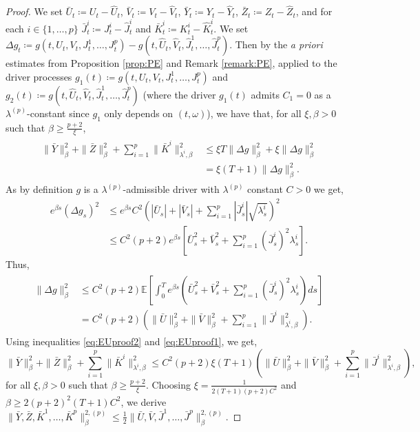 \documentclass[11pt,a4paper]{article}
\numberwithin{equation}{section}
\theoremstyle{newPlain}
\theoremstyle{newDefinition}
\theoremstyle{newRemark}
\begin{document}
{\begin{proof}
    We set $\bar{U}_t\coloneqq U_t-\hat{U}_t$, $\bar{V}_t\coloneqq V_t - \hat{V}_t$, $\bar{Y}_t\coloneqq Y_t - \hat{Y}_t$, $\bar{Z}_t\coloneqq Z_t - \hat{Z}_t$, and for each $i\in\{1,\ldots,p\}$ $\bar{J}_t^i\coloneqq J_t^i - \hat{J}_t^i$ and $\bar{K}_t^i\coloneqq K_t^i - \hat{K}_t^i$. We set $\Delta g_t\coloneqq g(t,U_t,V_t,J_t^1,\ldots,J_t^p) - g(t,\hat{U}_t,\hat{V}_t,\hat{J}_t^1,\ldots,\hat{J}_t^p)$.
    Then by the \emph{a priori} estimates from Proposition \ref{prop:PE} and Remark \ref{remark:PE}, applied to the driver processes $g_1(t)\coloneqq g(t,U_t,V_t,J_t^1,\ldots,J_t^p)$ and $g_2(t)\coloneqq g(t,\hat{U}_t,\hat{V}_t,\hat{J}_t^1,\ldots,\hat{J}_t^p)$ (where the driver $g_1(t)$ admits $C_1=0$ as a $\lambda^{(p)}$-constant since $g_1$ only depends on $(t,\omega)$), we have that,  for all $\xi,\beta>0$ such that $\beta\ge\frac{p+2}{\xi}$,
    \begin{align}\label{eq:EUproof1}
        \begin{aligned}
            \|\bar{Y}\|_\beta^2+\|\bar{Z}\|_\beta^2+\sum_{i=1}^p\|\bar{K}^i\|_{\lambda^i,\beta}^2 &\le \xi T\|\Delta g\|_\beta^2 + \xi \|\Delta g\|_\beta^2\\
            &=\xi(T+1)\|\Delta g\|_\beta^2.
        \end{aligned}
    \end{align}
 As by definition $g$ is a $\lambda^{(p)}$-admissible driver with $\lambda^{(p)}$ constant $C>0$ we get,
    \begin{align*}
        e^{\beta s}(\Delta g_s)^2 &\le e^{\beta s}C^2(|\bar{U}_s| + |\bar{V}_s| + \sum_{i=1}^p|\bar{J}_s^i|\sqrt{\lambda_s^i})^2\\
        &\le C^2(p+2)e^{\beta s}[\bar{U}_s^2+\bar{V}_s^2+\sum_{i=1}^p(\bar{J}_s^i)^2\lambda_s^i].
    \end{align*}
    Thus,
    \begin{align}\label{eq:EUproof2}
        \begin{aligned}
        \|\Delta g\|_\beta^2 &\le C^2(p+2)\mathbb{E}\left[\int_0^Te^{\beta s}(\bar{U}_s^2+\bar{V}_s^2+\sum_{i=1}^p(\bar{J}_s^i)^2\lambda_s^i)ds\right]\\
        &=C^2(p+2)(\|\bar{U}\|_\beta^2+\|\bar{V}\|_\beta^2+\sum_{i=1}^p\|\bar{J}^i\|_{\lambda^i,\beta}^2).
        \end{aligned}
    \end{align}
    Using inequalities \eqref{eq:EUproof2} and \eqref{eq:EUproof1}, we get,
    \begin{equation}\label{eq:EUproof3}
        \|\bar{Y}\|_\beta^2+\|\bar{Z}\|_\beta^2+\sum_{i=1}^p\|\bar{K}^i\|_{\lambda^i,\beta}^2 \le C^2(p+2)\xi(T+1)(\|\bar{U}\|_\beta^2+\|\bar{V}\|_\beta^2+\sum_{i=1}^p\|\bar{J}^i\|_{\lambda^i,\beta}^2),
    \end{equation}
    for all $\xi,\beta>0$ such that $\beta \ge \frac{p+2}{\xi}$. Choosing $\xi=\frac{1}{2(T+1)(p+2)C^2}$ and $\beta\ge2(p+2)^2(T+1)C^2$, we derive $\|\bar{Y},\bar{Z},\bar{K}^1,\ldots,\bar{K}^p\|_\beta^{2,(p)}\le\frac{1}{2}\|\bar{U},\bar{V},\bar{J}^1,\ldots,\bar{J}^p\|_\beta^{2,(p)}$.


\end{proof}}
\end{document}
